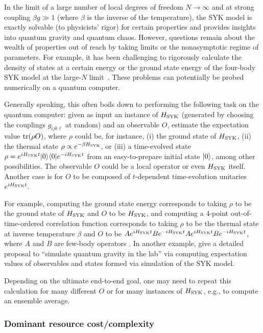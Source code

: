 \begin{refsection}
In the limit of a large number of local degrees of freedom $N\rightarrow \infty$ and at strong coupling $\beta g \gg 1$ (where $\beta$ is the inverse of the temperature), the SYK model is exactly solvable (to physicists' rigor) for certain properties and provides insights into quantum gravity and quantum chaos. However, questions remain about the wealth of properties out of reach by taking limits or the nonasymptotic regime of parameters. For example, it has been challenging to rigorously calculate
the density of states at a certain energy or the ground state energy of the four-body SYK model at the large-$N$ limit~\cite{cotler2017black,babbush2019SYKmodel,hastings2022optimizing}.
These problems can potentially be probed numerically on a quantum computer. 

Generally speaking, this often boils down to performing the following task on the quantum computer: given as input an instance of $H_{\rm SYK}$ (generated by choosing the couplings $g_{ijk\ell}$ at random) and an observable $O$, estimate the expectation value $\text{tr}(\rho O)$, where $\rho$ could be, for instance, (i) the ground state of $H_{\rm SYK}$, (ii) the thermal state $\rho \propto e^{-\beta H_{\rm SYK}}$, or (iii) a time-evolved state $\rho = e^{iH_{\rm SYK}t}\lvert0\rangle\langle0\rvert e^{-iH_{\rm SYK}t}$ from an easy-to-prepare initial state $\lvert0\rangle$, among other possibilities. The observable $O$ could be a local operator or even $H_{\rm SYK}$ itself. Another case is for $O$ to be composed of $t$-dependent time-evolution unitaries $e^{iH_{\rm SYK}t}$. 

For example, computing the ground state energy corresponds to taking $\rho$ to be the ground state of $H_{\rm SYK}$ and $O$ to be $H_{\rm SYK}$, and computing a 4-point out-of-time-ordered correlation function corresponds to taking $\rho$ to be the thermal state at inverse temperature $\beta$ and $O$ to be $Ae^{iH_{\rm SYK}t}Be^{-iH_{\rm SYK}t}Ae^{iH_{\rm SYK}t}Be^{-iH_{\rm SYK}t}$, where $A$ and $B$ are few-body operators \cite{hunter-jones2018PhDThesis}.  In another example, \cite{Brown2019QuantumGI,nezami2023QuantumGravityInLabII} give a detailed proposal to ``simulate quantum gravity in the lab'' via computing expectation values of observables and states formed via simulation of the SYK model. 

Depending on the ultimate end-to-end goal, one may need to repeat this calculation for many different $O$ or for many instances of $H_{\rm SYK}$, e.g., to compute an ensemble average. 


\subsubsection*{Dominant resource cost/complexity}


\end{refsection}

